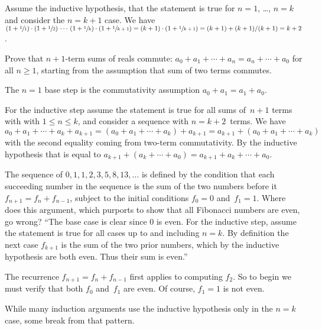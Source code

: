 \documentclass{ibl}  %
\begin{document}
\begin{problem}
\begin{exes}
\begin{answer}
  Assume the inductive hypothesis, that the statement is true for
  $n=1$, \ldots, $n=k$ and consider the $n=k+1$ case.
  We have
  $(1+\sfrac{1}{1})\cdot(1+\sfrac{1}{2})\,\cdots\,(1+\sfrac{1}{k})\cdot(1+\sfrac{1}{k+1})
  =
  (k+1)\cdot(1+\sfrac{1}{k+1})
  =(k+1)+(k+1)/(k+1)
  =k+2$.  
\end{answer}
\end{exes}
\end{problem}

\begin{problem}
Prove that $n+1$-term sums of reals commute:
$a_0+a_1+\cdots+a_n=a_n+\cdots+a_0$ for all $n\geq 1$,
starting from the assumption that sum of two terms commutes.
\begin{answer}
The $n=1$ base step is the commutativity assumption $a_0+a_1=a_1+a_0$.

For the inductive step assume the statement is true for all 
sums of~$n+1$ terms with 
with $1\leq n\leq k$, and consider a sequence with $n=k+2$~terms.
We have 
$a_0+a_1+\cdots+a_k+a_{k+1}
=(a_0+a_1+\cdots+a_k)+a_{k+1}
=a_{k+1}+(a_0+a_1+\cdots+a_k)$ with the second equality coming from
two-term commutativity.
By the inductive hypothesis that is equal to 
$a_{k+1}+(a_k+\cdots+a_0)=a_{k+1}+a_k+\cdots+a_0$.
\end{answer}
\end{problem}

\begin{problem}[\maxlength]
The sequence of 
$0,1,1,2,3,5,8,13, \ldots$ is defined by the condition that 
each succeeding number in the sequence is the sum of the 
two numbers before it $f_{n+1}=f_n+f_{n-1}$, subject to the initial conditions
$f_0=0$ and~$f_1=1$.
Where does this argument, which purports to show that
all Fibonacci numbers are even, go wrong?
``The base case is clear since $0$ is even.  
For the inductive step, assume the statement 
is true for all cases up to and including $n=k$.
By definition 
the next case $f_{k+1}$ is the sum of the two prior numbers, which by
the inductive hypothesis are both even.  
Thus their sum is even.''   
\begin{answer}
The recurrence $f_{n+1}=f_n+f_{n-1}$ first applies to computing $f_2$.
So to begin we must verify that both $f_0$ and~$f_1$ are even.
Of course, $f_1=1$ is not even.
\end{answer}
\end{problem}

While many induction arguments use the inductive 
hypothesis only in the $n=k$ case,
some break from that pattern.
\end{document}
